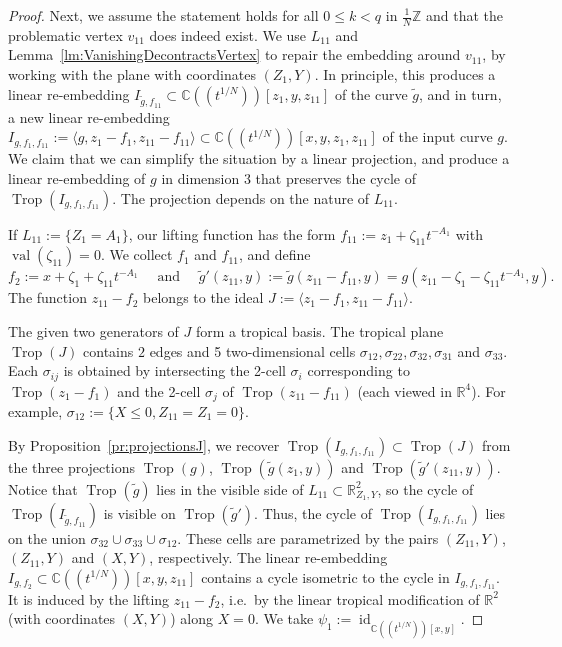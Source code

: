\documentclass[11pt]{amsart}
\numberwithin{equation}{section}
\theoremstyle{plain}
\theoremstyle{definition}
\theoremstyle{remark}
\begin{document}
\begin{proof}
  Next, we assume the statement holds for all $0\leq k<q$ in
  $\frac{1}{N}{\mathbb{Z}}$ and that the problematic vertex $v_{11}$ does
  indeed exist. We use $L_{11}$ and
  Lemma~\ref{lm:VanishingDecontractsVertex} to repair the embedding
  around $v_{11}$, by working with the plane with coordinates
  $(Z_1,Y)$. In principle, this produces a linear re-embedding
  $I_{\tilde{g}, f_{11}}\subset {{\mathbb{C}}(\!(t^{1/N})\!)}[z_1,y,z_{11}]$ of the curve
  $\tilde{g}$, and in turn, a new linear re-embedding
  $I_{g,f_1,f_{11}}:=\langle g,z_1-f_1,z_{11}-f_{11}\rangle \subset
  {{\mathbb{C}}(\!(t^{1/N})\!)}[x,y,z_1,z_{11}]$ of the input curve $g$. We claim that we can
  simplify the situation by a linear projection, and produce a linear
  re-embedding of $g$ in dimension $3$ that preserves the cycle of
  $\operatorname{Trop}(I_{g,f_1,f_{11}})$. The projection depends on the nature of
  $L_{11}$.

  If $L_{11}:=\{Z_1=A_1\}$, our lifting function has the form
  $f_{11}:=z_1+{\zeta}_{11}t^{-A_1}$ with $\operatorname{val}({\zeta}_{11})=0$.
  We collect $f_1$ and $f_{11}$, and define
  \[f_2:=x+{\zeta}_1+{\zeta}_{11}t^{-A_1}\quad\text{ and }\quad
  \tilde{g}'(z_{11},y):=\tilde{g}(z_{11}-f_{11},y)= g(z_{11}-{\zeta}_1-
  {\zeta}_{11}t^{-A_1},y).\] The function $z_{11}-f_2$ belongs to the ideal
  $J:=\langle z_1-f_1,z_{11}-f_{11}\rangle$. 

  The given two generators of $J$ form a tropical basis. The tropical
  plane $\operatorname{Trop}(J)$ contains $2$ edges and 5 two-dimensional cells
  $\sigma_{12},\sigma_{22}, \sigma_{32}, \sigma_{31}$ and $\sigma_{33}$.
  Each $\sigma_{ij}$ is obtained by intersecting the 2-cell $\sigma_i$
  corresponding to $\operatorname{Trop}(z_1-f_1)$ and the 2-cell $\sigma_j$ of
  $\operatorname{Trop}(z_{11}-f_{11})$ (each viewed in ${\mathbb{R}}^4$). For example,
  $\sigma_{12}:=\{X\leq 0,Z_{11}=Z_{1}=0\}$.

  By Proposition~\ref{pr:projectionsJ}, we recover
  $\operatorname{Trop}(I_{g,f_1,f_{11}})\subset \operatorname{Trop}(J)$ from the three projections
  $\operatorname{Trop}(g)$, $\operatorname{Trop}(\tilde{g}(z_1,y))$ and
  $\operatorname{Trop}(\tilde{g}'(z_{11},y))$.  Notice that $\operatorname{Trop}(\tilde{g})$ lies
  in the visible side of $L_{11}\subset {\mathbb{R}}^2_{Z_1,Y}$, so the cycle
  of $\operatorname{Trop}(I_{\tilde{g},f_{11}})$ is visible on $\operatorname{Trop}(\tilde{g}')$.
  Thus, the cycle of $\operatorname{Trop}(I_{g,f_1,f_{11}})$ lies on the union
  $\sigma_{32}\cup \sigma_{33}\cup\sigma_{12}$. These cells are
  parametrized by the pairs $(Z_{11},Y)$, $(Z_{11},Y)$ and $(X,Y)$,
  respectively. The linear re-embedding $I_{g,f_{2}}\subset
  {{\mathbb{C}}(\!(t^{1/N})\!)}[x,y,z_{11}]$ contains a cycle isometric to the cycle in
  $I_{g,f_1,f_{11}}$. It is induced by the lifting $z_{11}-f_2$, i.e.\
  by the linear tropical modification of ${\mathbb{R}}^2$ (with coordinates
  $(X,Y)$) along $X=0$. We take $\psi_1:=\operatorname{id}_{{{\mathbb{C}}(\!(t^{1/N})\!)}[x,y]}$.


\end{proof}
\end{document}
